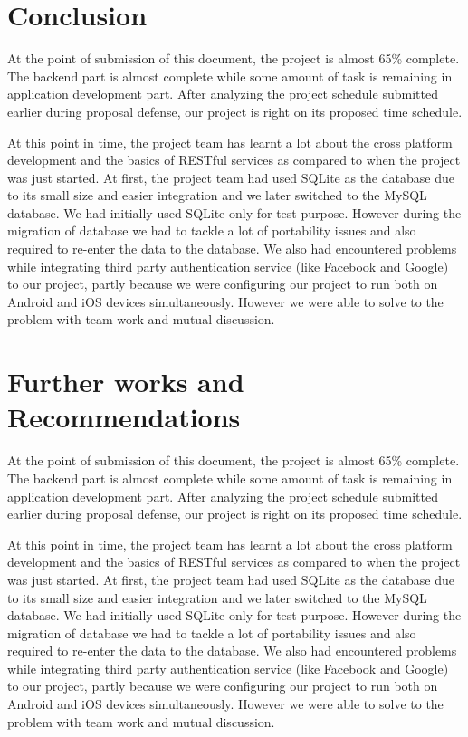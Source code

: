 \documentclass[12pt, a4paper, oneside]{article}
\begin{document}
\pagebreak
\section{Conclusion}
At the point of submission of this document, the project is almost 65\% complete. The backend part is almost complete while some amount of task is remaining in application development part. After analyzing the project schedule submitted earlier during proposal defense, our project is right on its proposed time schedule.

At this point in time, the project team has learnt a lot about the cross platform development and the basics of RESTful services as compared to when the project was just started. At first, the project team had used SQLite as the database due to its small size and easier integration and we later switched to the MySQL database. We had initially used SQLite only for test purpose. However during the migration of database we had to tackle a lot of portability issues and also required to re-enter the data to the database. We also had encountered problems while integrating third party authentication service (like Facebook and Google) to our project, partly because we were configuring our project to run both on Android and iOS devices simultaneously. However we were able to solve to the problem with team work and mutual discussion.

\pagebreak
\section{Further works and Recommendations}
At the point of submission of this document, the project is almost 65\% complete. The backend part is almost complete while some amount of task is remaining in application development part. After analyzing the project schedule submitted earlier during proposal defense, our project is right on its proposed time schedule.

At this point in time, the project team has learnt a lot about the cross platform development and the basics of RESTful services as compared to when the project was just started. At first, the project team had used SQLite as the database due to its small size and easier integration and we later switched to the MySQL database. We had initially used SQLite only for test purpose. However during the migration of database we had to tackle a lot of portability issues and also required to re-enter the data to the database. We also had encountered problems while integrating third party authentication service (like Facebook and Google) to our project, partly because we were configuring our project to run both on Android and iOS devices simultaneously. However we were able to solve to the problem with team work and mutual discussion.


\break
{}



\break
{}
\end{document}
